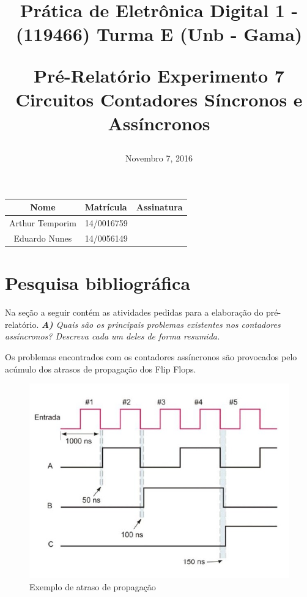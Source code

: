 \documentclass[12pts]{article}
\title{
	Prática de Eletrônica Digital 1 - (119466)
	\singlespacing
		Turma E (Unb - Gama)
	\singlespacing
	\begin{midpage}
	\begin {large}
		Pré-Relatório Experimento 7
		\singlespace
		Circuitos Contadores Síncronos e Assíncronos
	\end {large}
	\end{midpage}
}
\date{Novembro 7, 2016}
\begin{document}
\maketitle	
\begin{center}

\begin{tabular}{|c|l|r|}
\hline
Nome & Matrícula & Assinatura\\
\hline
Arthur Temporim & 14/0016759 & \\
\hline	
Eduardo Nunes & 14/0056149 & \\
\hline	
\end{tabular}

\end{center}

\pagebreak

\section{Pesquisa bibliográfica}

	Na seção a seguir contém as atividades pedidas para a elaboração do pré-relatório.
\singlespacing
\textit{\textbf{A)} Quais são os principais problemas existentes nos contadores assíncronos? Descreva cada um deles de forma resumida.}
\singlespacing

Os problemas encontrados com os contadores assíncronos são provocados pelo acúmulo dos atrasos de propagação dos Flip Flops.

\begin{figure}[!htb]
  \centering
  \includegraphics[scale=0.4]{imagens/oi.png}
  \caption{Exemplo de atraso de propagação}
  \label{figRotulo}
\end{figure}
\end{document}
